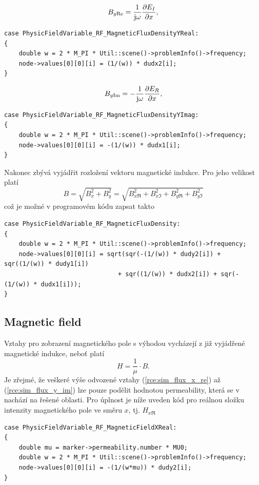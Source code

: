 \begin{equation}
	B_{y\mathrm{Re}} = \frac{1}{\mathrm{j}\omega}\frac{\partial E_I}{\partial x},
	\label{rce:sim_flux_y_re}
\end{equation}
\begin{verbatim}
case PhysicFieldVariable_RF_MagneticFluxDensityYReal:
{
    double w = 2 * M_PI * Util::scene()->problemInfo()->frequency;
    node->values[0][0][i] = (1/(w)) * dudx2[i];
}
\end{verbatim}
\begin{equation}
	B_{y\mathrm{Im}} = -\frac{1}{\mathrm{j}\omega}\frac{\partial E_R}{\partial x},
	\label{rce:sim_flux_y_im}
\end{equation}
\begin{verbatim}
case PhysicFieldVariable_RF_MagneticFluxDensityYImag:
{
    double w = 2 * M_PI * Util::scene()->problemInfo()->frequency;
    node->values[0][0][i] = -(1/(w)) * dudx1[i];
}
\end{verbatim}
Nakonec zbývá vyjádřit rozložení vektoru magnetické indukce. Pro jeho velikost platí
\begin{displaymath}
	B = \sqrt{B_{x}^{2} + B_{y}^{2}} = \sqrt{B_{x\Re}^{2} + B_{x\Im}^{2} + B_{y\Re}^{2} + B_{y\Im}^{2}}
\end{displaymath}
což je možné v programovém kódu zapsat takto
\begin{verbatim}
case PhysicFieldVariable_RF_MagneticFluxDensity:
{
    double w = 2 * M_PI * Util::scene()->problemInfo()->frequency;
    node->values[0][0][i] = sqrt(sqr(-(1/(w)) * dudy2[i]) + sqr((1/(w)) * dudy1[i])
                               + sqr((1/(w)) * dudx2[i]) + sqr(-(1/(w)) * dudx1[i]));
}
\end{verbatim}

\subsection*{Magnetic field}
Vztahy pro zobrazení magnetického pole s výhodou vycházejí z již vyjádřené magnetické indukce, neboť platí
\begin{displaymath}
H = \frac{1}{\mu}\cdot B.
\end{displaymath}
Je zřejmé, že veškeré výše odvozené vztahy (\ref{rce:sim_flux_x_re}) až (\ref{rce:sim_flux_y_im}) lze pouze podělit hodnotou permeability, která se v nachází na řešené oblasti. Pro úplnost je níže uveden kód pro reálnou složku intenzity magnetického pole ve směru $x$, tj. $H_{x\Re}$
\begin{verbatim}
case PhysicFieldVariable_RF_MagneticFieldXReal:
{
    double mu = marker->permeability.number * MU0;
    double w = 2 * M_PI * Util::scene()->problemInfo()->frequency;
    node->values[0][0][i] = -(1/(w*mu)) * dudy2[i];
}
\end{verbatim}

